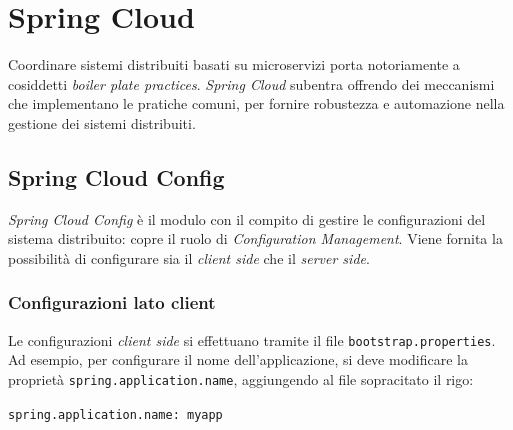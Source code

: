
\chapter{Spring Cloud}\label{cap:spring-cloud}



\bigskip

Coordinare sistemi distribuiti basati su microservizi porta notoriamente a cosiddetti \textit{boiler plate practices}. \textit{Spring Cloud} subentra offrendo dei meccanismi che implementano le pratiche comuni, per fornire robustezza e automazione nella gestione dei sistemi distribuiti.

\clearpage


\section{Spring Cloud Config}

\textit{Spring Cloud Config} è il modulo con il compito di gestire le configurazioni del sistema distribuito: copre il ruolo di \textit{Configuration Management}.
Viene fornita la possibilità di configurare sia il \textit{client side} che il \textit{server side}.

\subsection{Configurazioni lato client} Le configurazioni \textit{client side} si effettuano tramite
il file \texttt{bootstrap.properties}. Ad esempio, per configurare il nome dell'applicazione, si deve
modificare la proprietà \texttt{spring.application.name}, aggiungendo al file sopracitato il rigo:

\begin{tcolorbox}
\texttt{spring.application.name: myapp}
\end{tcolorbox}

